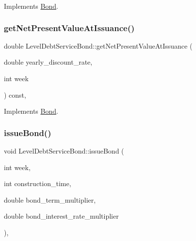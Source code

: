 Implements \mbox{\hyperlink{classBond_a98d8ecaf4b36319674ebd220598996bc_a98d8ecaf4b36319674ebd220598996bc}{Bond}}.

\mbox{\label{classLevelDebtServiceBond_a0f5820c3e76b8b908dbe153a8291d96a_a0f5820c3e76b8b908dbe153a8291d96a}} 
\subsubsection{\texorpdfstring{get\+Net\+Present\+Value\+At\+Issuance()}{getNetPresentValueAtIssuance()}}
{\footnotesize\ttfamily double Level\+Debt\+Service\+Bond\+::get\+Net\+Present\+Value\+At\+Issuance (\begin{DoxyParamCaption}\item[{double}]{yearly\+\_\+discount\+\_\+rate,  }\item[{int}]{week }\end{DoxyParamCaption}) const\hspace{0.3cm}{\ttfamily [override]}, {\ttfamily [virtual]}}



Implements \mbox{\hyperlink{classBond_a5997278813deb16aa5d01bbca8ecc7b2_a5997278813deb16aa5d01bbca8ecc7b2}{Bond}}.

\mbox{\label{classLevelDebtServiceBond_a51a54a1a25be105b168bf86489aee417_a51a54a1a25be105b168bf86489aee417}} 
\subsubsection{\texorpdfstring{issue\+Bond()}{issueBond()}}
{\footnotesize\ttfamily void Level\+Debt\+Service\+Bond\+::issue\+Bond (\begin{DoxyParamCaption}\item[{int}]{week,  }\item[{int}]{construction\+\_\+time,  }\item[{double}]{bond\+\_\+term\+\_\+multiplier,  }\item[{double}]{bond\+\_\+interest\+\_\+rate\+\_\+multiplier }\end{DoxyParamCaption})\hspace{0.3cm}{\ttfamily [override]}, {\ttfamily [virtual]}}

